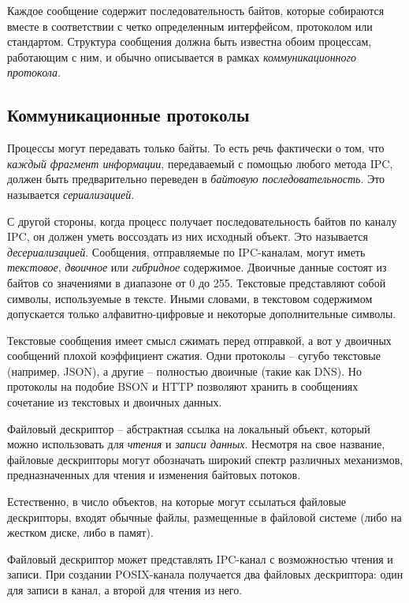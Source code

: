 \documentclass[%
	11pt,
	a4paper,
	utf8,
		]{article}
\begin{document}
Каждое сообщение содержит последовательность байтов, которые собираются вместе в соответствии с четко определенным интерфейсом, протоколом или стандартом. Структура сообщения должна быть известна обоим процессам, работающим с ним, и обычно описывается в рамках \emph{коммуникационного протокола}.

\subsection{Коммуникационные протоколы}

Процессы могут передавать только байты. То есть речь фактически о том, что \emph{каждый фрагмент информации}, передаваемый с помощью любого метода IPC, должен быть предварительно переведен в \emph{байтовую последовательность}. Это называется \emph{сериализацией}.

С другой стороны, когда процесс получает последовательность байтов по каналу IPC, он должен уметь воссоздать из них исходный объект. Это называется \emph{десериализацией}. Сообщения, отправляемые по IPC-каналам, могут иметь \emph{текстовое}, \emph{двоичное} или \emph{гибридное} содержимое. Двоичные данные состоят из байтов со значениями в диапазоне от 0 до 255. Текстовые представляют собой символы, используемые в тексте. Иными словами, в текстовом содержимом допускается только алфавитно-цифровые и некоторые дополнительные символы.

Текстовые сообщения имеет смысл сжимать перед отправкой, а вот у двоичных сообщений плохой коэффициент сжатия. Одни протоколы -- сугубо текстовые (например, JSON), а другие -- полностью двоичные (такие как DNS). Но протоколы на подобие BSON и HTTP позволяют хранить в сообщениях сочетание из текстовых и двоичных данных.

Файловый дескриптор -- абстрактная ссылка на локальный объект, который можно использовать для \emph{чтения} и \emph{записи данных}. Несмотря на свое название, файловые дескрипторы могут обозначать широкий спектр различных механизмов, предназначенных для чтения и изменения байтовых потоков.

Естественно, в число объектов, на которые могут ссылаться файловые дескрипторы, входят обычные файлы, размещенные в файловой системе (либо на жестком диске, либо в памят).

Файловый дескриптор может представлять IPC-канал с возможностью чтения и записи. При создании POSIX-канала получается два файловых дескриптора: один для записи в канал, а второй для чтения из него.
\end{document}
